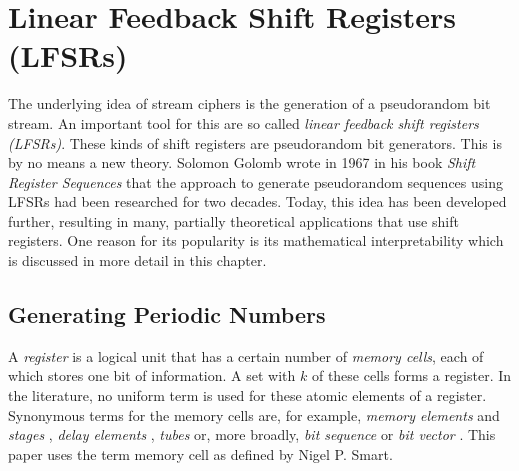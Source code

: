 \section{Linear Feedback Shift Registers (LFSRs)}
The underlying idea of stream ciphers is the generation of a pseudorandom bit stream. An important tool for this are so called \textit{linear feedback shift registers (LFSRs)}. These kinds of shift registers are pseudorandom bit generators. This is by no means a new theory. Solomon Golomb wrote in 1967 in his book \textit{Shift Register Sequences} that the approach to generate pseudorandom sequences using LFSRs had been researched for two decades. \cite[p. 2]{Golomb.1967} Today, this idea has been developed further, resulting in many, partially theoretical applications that use shift registers. One reason for its popularity is its mathematical interpretability which is discussed in more detail in this chapter. 

\subsection{Generating Periodic Numbers}
A \textit{register} is a logical unit that has a certain number of \textit{memory cells}, each of which stores one bit of information. A set with $k$ of these cells forms a register. In the literature, no uniform term is used for these atomic elements of a register. Synonymous terms for the memory cells are, for example, \textit{memory elements} and \textit{stages} \cite[p. 81]{Stamp.2007}, \textit{delay elements} \cite[pp. 186-187]{Lidl.1986}, \textit{tubes} \cite[p. 27]{Golomb.1967} or, more broadly, \textit{bit sequence} \cite[p. 429]{Schneier.2006} or \textit{bit vector} \cite[p. 198]{Ertel.2020}. This paper uses the term memory cell as defined by Nigel P. Smart. \cite[p. 227]{Smart.2016} \\

